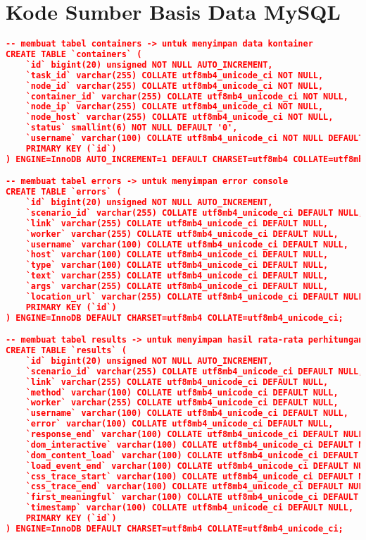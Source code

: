 \section*{Kode Sumber Basis Data MySQL} \label{mysql}
	
\begin{lstlisting}[frame=single,tabsize=2,breaklines,caption={Basis data MySQL},label=mysql, captionpos=b, language=json]
-- membuat tabel containers -> untuk menyimpan data kontainer
CREATE TABLE `containers` (
	`id` bigint(20) unsigned NOT NULL AUTO_INCREMENT,
	`task_id` varchar(255) COLLATE utf8mb4_unicode_ci NOT NULL,
	`node_id` varchar(255) COLLATE utf8mb4_unicode_ci NOT NULL,
	`container_id` varchar(255) COLLATE utf8mb4_unicode_ci NOT NULL,
	`node_ip` varchar(255) COLLATE utf8mb4_unicode_ci NOT NULL,
	`node_host` varchar(255) COLLATE utf8mb4_unicode_ci NOT NULL,
	`status` smallint(6) NOT NULL DEFAULT '0',
	`username` varchar(100) COLLATE utf8mb4_unicode_ci NOT NULL DEFAULT '0',
	PRIMARY KEY (`id`)
) ENGINE=InnoDB AUTO_INCREMENT=1 DEFAULT CHARSET=utf8mb4 COLLATE=utf8mb4_unicode_ci;

-- membuat tabel errors -> untuk menyimpan error console
CREATE TABLE `errors` (
	`id` bigint(20) unsigned NOT NULL AUTO_INCREMENT,
	`scenario_id` varchar(255) COLLATE utf8mb4_unicode_ci DEFAULT NULL,
	`link` varchar(255) COLLATE utf8mb4_unicode_ci DEFAULT NULL,
	`worker` varchar(255) COLLATE utf8mb4_unicode_ci DEFAULT NULL,
	`username` varchar(100) COLLATE utf8mb4_unicode_ci DEFAULT NULL,
	`host` varchar(100) COLLATE utf8mb4_unicode_ci DEFAULT NULL,
	`type` varchar(100) COLLATE utf8mb4_unicode_ci DEFAULT NULL,
	`text` varchar(255) COLLATE utf8mb4_unicode_ci DEFAULT NULL,
	`args` varchar(255) COLLATE utf8mb4_unicode_ci DEFAULT NULL,
	`location_url` varchar(255) COLLATE utf8mb4_unicode_ci DEFAULT NULL,
	PRIMARY KEY (`id`)
) ENGINE=InnoDB DEFAULT CHARSET=utf8mb4 COLLATE=utf8mb4_unicode_ci;

-- membuat tabel results -> untuk menyimpan hasil rata-rata perhitungan hasil pengujian
CREATE TABLE `results` (
	`id` bigint(20) unsigned NOT NULL AUTO_INCREMENT,
	`scenario_id` varchar(255) COLLATE utf8mb4_unicode_ci DEFAULT NULL,
	`link` varchar(255) COLLATE utf8mb4_unicode_ci DEFAULT NULL,
	`method` varchar(100) COLLATE utf8mb4_unicode_ci DEFAULT NULL,
	`worker` varchar(255) COLLATE utf8mb4_unicode_ci DEFAULT NULL,
	`username` varchar(100) COLLATE utf8mb4_unicode_ci DEFAULT NULL,
	`error` varchar(100) COLLATE utf8mb4_unicode_ci DEFAULT NULL,
	`response_end` varchar(100) COLLATE utf8mb4_unicode_ci DEFAULT NULL,
	`dom_interactive` varchar(100) COLLATE utf8mb4_unicode_ci DEFAULT NULL,
	`dom_content_load` varchar(100) COLLATE utf8mb4_unicode_ci DEFAULT NULL,
	`load_event_end` varchar(100) COLLATE utf8mb4_unicode_ci DEFAULT NULL,
	`css_trace_start` varchar(100) COLLATE utf8mb4_unicode_ci DEFAULT NULL,
	`css_trace_end` varchar(100) COLLATE utf8mb4_unicode_ci DEFAULT NULL,
	`first_meaningful` varchar(100) COLLATE utf8mb4_unicode_ci DEFAULT NULL,
	`timestamp` varchar(100) COLLATE utf8mb4_unicode_ci DEFAULT NULL,
	PRIMARY KEY (`id`)
) ENGINE=InnoDB DEFAULT CHARSET=utf8mb4 COLLATE=utf8mb4_unicode_ci;


\end{lstlisting}
